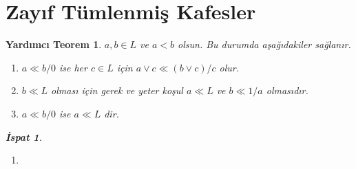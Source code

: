 \documentclass[a4paper,12pt]{article}
\numberwithin{equation}{section}
\theoremstyle{italik}
\newtheorem{lemma}[teorem]{Yardımcı Teorem}
\newtheorem*{ispat}{İspat}
\begin{document}
\section{Zayıf Tümlenmiş Kafesler}
\begin{lemma}\label{thm:teo1}
$ a,b \in L $ ve $ a < b $ olsun. Bu durumda aşağıdakiler sağlanır.
\begin{enumerate}

\itemsep 0em
\item $ a \ll b/0 $ ise her $ c \in L $ için $ a \vee c \ll (b \vee c)/c $ olur. \label{teo11}
\item $ b \ll L $ olması için gerek ve yeter koşul $ a \ll L $ ve $ b \ll 1/a $ olmasıdır. \label{teo12}
\item $ a \ll b/0 $ ise $ a \ll L $ dir. \label{teo13}
\end{enumerate}
\begin{ispat}
\setlength{\leftmargini}{0pt}
\begin{enumerate}
\itemindent 25pt
 \item 



\end{enumerate}
\end{ispat}
\end{lemma}
\end{document}
